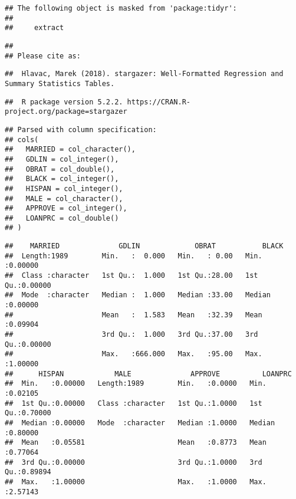 \documentclass[]{article}
\begin{document}
\begin{verbatim}
## The following object is masked from 'package:tidyr':
## 
##     extract
\end{verbatim}

\begin{verbatim}
## 
## Please cite as:
\end{verbatim}

\begin{verbatim}
##  Hlavac, Marek (2018). stargazer: Well-Formatted Regression and Summary Statistics Tables.
\end{verbatim}

\begin{verbatim}
##  R package version 5.2.2. https://CRAN.R-project.org/package=stargazer
\end{verbatim}

\begin{verbatim}
## Parsed with column specification:
## cols(
##   MARRIED = col_character(),
##   GDLIN = col_integer(),
##   OBRAT = col_double(),
##   BLACK = col_integer(),
##   HISPAN = col_integer(),
##   MALE = col_character(),
##   APPROVE = col_integer(),
##   LOANPRC = col_double()
## )
\end{verbatim}

\begin{verbatim}
##    MARRIED              GDLIN             OBRAT           BLACK        
##  Length:1989        Min.   :  0.000   Min.   : 0.00   Min.   :0.00000  
##  Class :character   1st Qu.:  1.000   1st Qu.:28.00   1st Qu.:0.00000  
##  Mode  :character   Median :  1.000   Median :33.00   Median :0.00000  
##                     Mean   :  1.583   Mean   :32.39   Mean   :0.09904  
##                     3rd Qu.:  1.000   3rd Qu.:37.00   3rd Qu.:0.00000  
##                     Max.   :666.000   Max.   :95.00   Max.   :1.00000  
##      HISPAN            MALE              APPROVE          LOANPRC       
##  Min.   :0.00000   Length:1989        Min.   :0.0000   Min.   :0.02105  
##  1st Qu.:0.00000   Class :character   1st Qu.:1.0000   1st Qu.:0.70000  
##  Median :0.00000   Mode  :character   Median :1.0000   Median :0.80000  
##  Mean   :0.05581                      Mean   :0.8773   Mean   :0.77064  
##  3rd Qu.:0.00000                      3rd Qu.:1.0000   3rd Qu.:0.89894  
##  Max.   :1.00000                      Max.   :1.0000   Max.   :2.57143
\end{verbatim}
\end{document}
